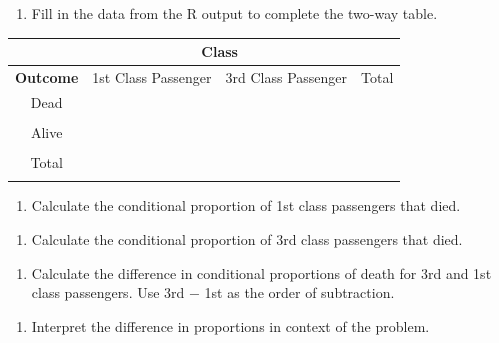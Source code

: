 \documentclass[
]{report}
\providecommand{\tightlist}{%
  \setlength{\itemsep}{0pt}\setlength{\parskip}{0pt}}
\begin{document}
\begin{enumerate}
\def\labelenumi{\arabic{enumi}.}
\tightlist
\item
  Fill in the data from the R output to complete the two-way table.
\end{enumerate}

\begin{center}
\begin{tabular}{|c|c|c|c|}
\hline
 & \multicolumn{2}{|c|}{\textbf{Class}} & \\ \hline
\textbf{Outcome} & 1st Class Passenger & 3rd Class Passenger & Total \\ \hline
 Dead & & &  \\ 
 & & & \\ \hline
 Alive & & &  \\ 
 & & & \\ \hline
 Total & & &  \\ 
 & & & \\ \hline  
\end{tabular}
\end{center}

\newpage

\begin{enumerate}
\def\labelenumi{\arabic{enumi}.}
\setcounter{enumi}{1}
\tightlist
\item
  Calculate the conditional proportion of 1st class passengers that died.
\end{enumerate}

\vspace{0.8in}

\begin{enumerate}
\def\labelenumi{\arabic{enumi}.}
\setcounter{enumi}{2}
\tightlist
\item
  Calculate the conditional proportion of 3rd class passengers that died.
\end{enumerate}

\vspace{0.8in}

\begin{enumerate}
\def\labelenumi{\arabic{enumi}.}
\setcounter{enumi}{3}
\tightlist
\item
  Calculate the difference in conditional proportions of death for 3rd and 1st class passengers. Use 3rd \(-\) 1st as the order of subtraction.
\end{enumerate}

\vspace{0.8in}

\begin{enumerate}
\def\labelenumi{\arabic{enumi}.}
\setcounter{enumi}{4}
\tightlist
\item
  Interpret the difference in proportions in context of the problem.
\end{enumerate}
\end{document}
